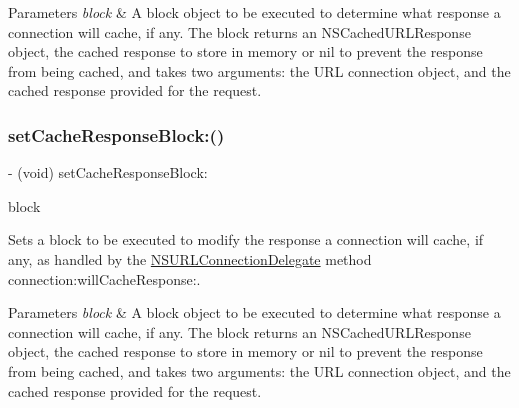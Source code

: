 \begin{DoxyParams}{Parameters}
{\em block} & A block object to be executed to determine what response a connection will cache, if any. The block returns an {\ttfamily N\+S\+Cached\+U\+R\+L\+Response} object, the cached response to store in memory or {\ttfamily nil} to prevent the response from being cached, and takes two arguments\+: the U\+RL connection object, and the cached response provided for the request. \\
\hline
\end{DoxyParams}
\mbox{\label{interface_a_f_u_r_l_connection_operation_a1de158a5fe7e2e45c6fc901a59870b28}} 
\subsubsection{\texorpdfstring{set\+Cache\+Response\+Block\+:()}{setCacheResponseBlock:()}\hspace{0.1cm}{\footnotesize\ttfamily [3/3]}}
{\footnotesize\ttfamily -\/ (void) set\+Cache\+Response\+Block\+: \begin{DoxyParamCaption}\item[{(nullable N\+S\+Cached\+U\+R\+L\+Response $\ast$($^\wedge$)(N\+S\+U\+R\+L\+Connection $\ast$connection, N\+S\+Cached\+U\+R\+L\+Response $\ast$cached\+Response))}]{block }\end{DoxyParamCaption}}

Sets a block to be executed to modify the response a connection will cache, if any, as handled by the {\ttfamily \mbox{\hyperlink{class_n_s_u_r_l_connection_delegate-p}{N\+S\+U\+R\+L\+Connection\+Delegate}}} method {\ttfamily connection\+:will\+Cache\+Response\+:}.


\begin{DoxyParams}{Parameters}
{\em block} & A block object to be executed to determine what response a connection will cache, if any. The block returns an {\ttfamily N\+S\+Cached\+U\+R\+L\+Response} object, the cached response to store in memory or {\ttfamily nil} to prevent the response from being cached, and takes two arguments\+: the U\+RL connection object, and the cached response provided for the request. \\
\hline
\end{DoxyParams}
\mbox{\label{interface_a_f_u_r_l_connection_operation_a0a6df99ee90311173f0a55248ccf19cb}} 
